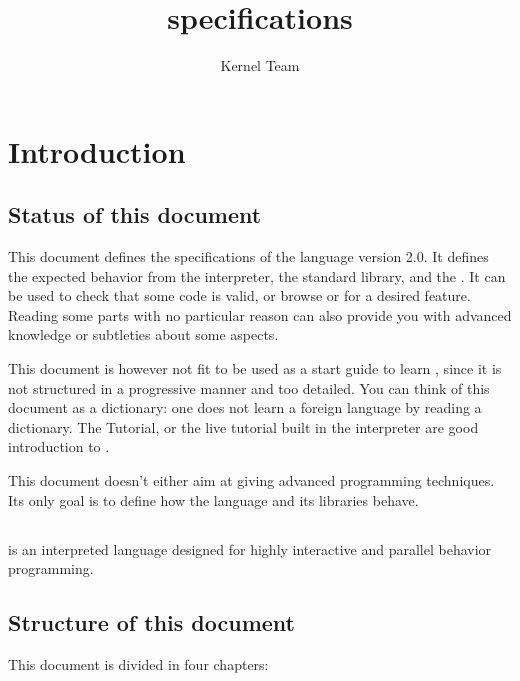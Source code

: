 \documentclass[openright,twoside,12pt]{report}
\title{\us 2.0 specifications}
\author{Kernel Team}
\begin{document}
\maketitle
\tableofcontents

\chapter*{Introduction}

\section*{Status of this document}

This document defines the specifications of the \us language version
2.0. It defines the expected behavior from the \us interpreter, the
standard library, and the \sdk. It can be used to check that some code
is valid, or browse \us or \Cxx \api for a desired feature. Reading
some parts with no particular reason can also provide you with
advanced knowledge or subtleties about some \us aspects.

This document is however not fit to be used as a start guide to learn
\us, since it is not structured in a progressive manner and too
detailed. You can think of this document as a dictionary: one does not
learn a foreign language by reading a dictionary. The \us Tutorial, or
the live \us tutorial built in the interpreter are good introduction
to \us.

This document doesn't either aim at giving advanced programming
techniques. Its only goal is to define how the language and its
libraries behave.

\section*{\us}

\us is an interpreted language designed for highly interactive and
parallel behavior programming. %

\section*{Structure of this document}

This document is divided in four chapters:
\end{document}
